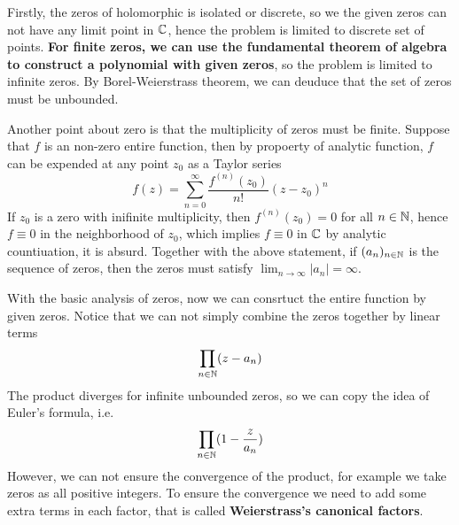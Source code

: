 \documentclass[12pt,a4paper]{article}
\begin{document}
Firstly, the zeros of holomorphic is isolated or discrete, so we the given zeros can not have any limit point in \(\mathbb{C}\), hence the problem is limited to discrete set of points. \textbf{For finite zeros, we can use the fundamental theorem of algebra to construct a polynomial with given zeros}, so the problem is limited to infinite zeros. By Borel-Weierstrass theorem, we can deuduce that the set of zeros must be unbounded.

Another point about zero is that the multiplicity of zeros must be finite. Suppose that \(f\) is an non-zero entire function, then by propoerty of analytic function, \(f\) can be expended at any point \(z_0\) as a Taylor series
\[f(z) = \sum_{n=0}^{\infty} \frac{f^{(n)}(z_0)}{n!} (z - z_0)^n\]
If \(z_0 \) is a zero with inifinite multiplicity, then \(f^{(n)}(z_0) = 0\) for all \(n \in \mathbb{N}\), hence \(f \equiv 0\) in the neighborhood of \(z_0\), which implies \(f \equiv 0\) in \(\mathbb{C}\) by analytic countiuation, it is absurd. Together with the above statement, if \((a_n)_{n \in \mathbb{N}}\) is the sequence of zeros, then the zeros must satisfy \(\lim_{n \to \infty} |a_n| = \infty\).

With the basic analysis of zeros, now we can consrtuct the entire function by given zeros. Notice that we can not simply combine the zeros together by linear terms
\[\prod_{n \in \mathbb{N}} (z-a_n)\]
The product diverges for infinite unbounded zeros, so we can copy the idea of Euler's formula, i.e.
\[\prod_{n \in \mathbb{N}} (1 - \frac{z}{a_n})\]
However, we can not ensure the convergence of the product, for example we take zeros as all positive integers. To ensure the convergence we need to add some extra terms in each factor, that is called \textbf{Weierstrass's canonical factors}.
\end{document}
